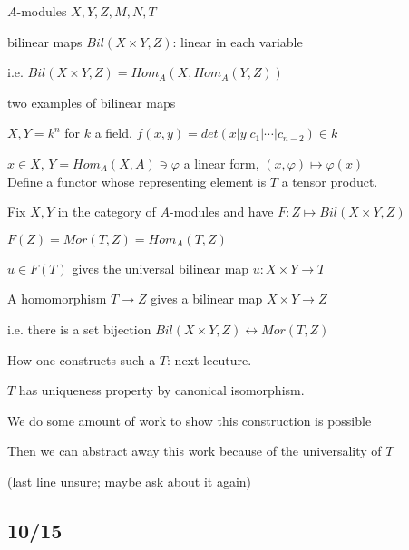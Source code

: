\documentclass[12pt]{article}
\begin{document}
$A$-modules $X, Y, Z, M, N, T$

bilinear maps $Bil(X \times Y, Z)$: linear in each variable

i.e. $Bil(X \times Y, Z) = Hom_A(X, Hom_A(Y, Z))$

\noindent
two examples of bilinear maps

$X, Y = k^n$ for $k$ a field, $f(x, y) = det(x | y | c_1 | \cdots | c_{n - 2}) \in k$

$x \in X$, $Y = Hom_A(X, A) \ni \varphi$ a linear form, $(x, \varphi) \mapsto \varphi(x)$\\

\noindent
Define a functor whose representing element is $T$ a tensor product.

Fix $X, Y$ in the category of $A$-modules and have $F: Z \mapsto Bil(X \times Y, Z)$

$F(Z) = Mor(T, Z) = Hom_A(T, Z)$

$u \in F(T)$ gives the universal bilinear map $u: X \times Y \to T$

A homomorphism $T \to Z$ gives a bilinear map $X \times Y \to Z$

i.e. there is a set bijection $Bil(X \times Y, Z) \leftrightarrow Mor(T, Z)$

How one constructs such a $T$: next lecuture.

\noindent
$T$ has uniqueness property by canonical isomorphism.

We do some amount of work to show this construction is possible

Then we can abstract away this work because of the universality of $T$

(last line unsure; maybe ask about it again)

\subsection{10/15}
\end{document}
